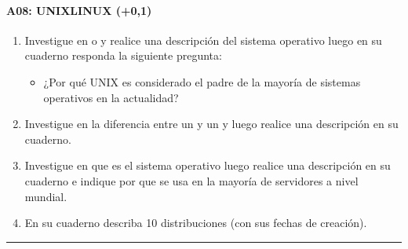 \documentclass[letterpaper,10pt,spanish]{sphinxmanual}
\begin{document}
\paragraph{A08: UNIX\sphinxhyphen{}LINUX (+0,1)}
\label{\detokenize{cursos/informatica10/periodo01/G01:a08-unix-linux-0-1}}
\sphinxAtStartPar
{}
\begin{enumerate}
%
\item {} 
\sphinxAtStartPar
Investigue en  o  y realice una descripción del sistema operativo  luego en su cuaderno responda la siguiente pregunta:
\begin{itemize}
\item {} 
\sphinxAtStartPar
¿Por qué UNIX es considerado el padre de la mayoría de sistemas operativos en la actualidad?

\end{itemize}

\item {} 
\sphinxAtStartPar
Investigue en  la diferencia entre un  y un  y luego realice una descripción en su cuaderno.

\item {} 
\sphinxAtStartPar
Investigue en  que es el sistema operativo  luego realice una descripción en su cuaderno e indique por que se usa en la mayoría de servidores a nivel mundial.

\item {} 
\sphinxAtStartPar
En su cuaderno describa 10 distribuciones  (con sus fechas de creación).

\end{enumerate}


\bigskip\hrule\bigskip
\end{document}
